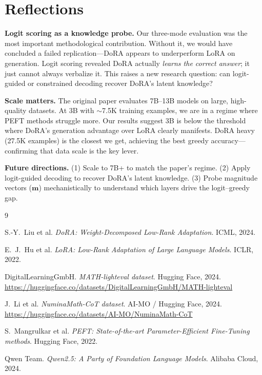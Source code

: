 \documentclass[11pt,twocolumn]{article}
\begin{document}
\section{Reflections}

\textbf{Logit scoring as a knowledge probe.} Our three-mode evaluation was the most important methodological contribution. Without it, we would have concluded a failed replication---DoRA appears to underperform LoRA on generation. Logit scoring revealed DoRA actually \emph{learns the correct answer}; it just cannot always verbalize it. This raises a new research question: can logit-guided or constrained decoding recover DoRA's latent knowledge?

\textbf{Scale matters.} The original paper evaluates 7B--13B models on large, high-quality datasets. At 3B with $\sim$7.5K training examples, we are in a regime where PEFT methods struggle more. Our results suggest 3B is below the threshold where DoRA's generation advantage over LoRA clearly manifests. DoRA heavy (27.5K examples) is the closest we get, achieving the best greedy accuracy---confirming that data scale is the key lever.

\textbf{Future directions.} (1) Scale to 7B+ to match the paper's regime. (2) Apply logit-guided decoding to recover DoRA's latent knowledge. (3) Probe magnitude vectors ($\mathbf{m}$) mechanistically to understand which layers drive the logit--greedy gap.

\newpage
\onecolumn
{\small

\begin{thebibliography}{9}

S.-Y.\ Liu et al.
\textit{DoRA: Weight-Decomposed Low-Rank Adaptation}.
ICML, 2024.

E.\ J.\ Hu et al.
\textit{LoRA: Low-Rank Adaptation of Large Language Models}.
ICLR, 2022.

DigitalLearningGmbH.
\textit{MATH-lighteval dataset}.
Hugging Face, 2024.
\url{https://huggingface.co/datasets/DigitalLearningGmbH/MATH-lighteval}

J.\ Li et al.
\textit{NuminaMath-CoT dataset}.
AI-MO / Hugging Face, 2024.
\url{https://huggingface.co/datasets/AI-MO/NuminaMath-CoT}

S.\ Mangrulkar et al.
\textit{PEFT: State-of-the-art Parameter-Efficient Fine-Tuning methods}.
Hugging Face, 2022.

Qwen Team.
\textit{Qwen2.5: A Party of Foundation Language Models}.
Alibaba Cloud, 2024.

\end{thebibliography}
}
\end{document}
